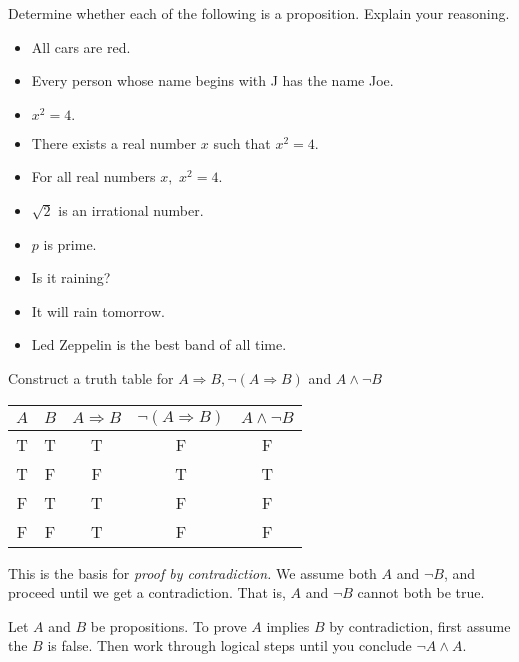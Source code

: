 \documentclass{../ximera}
\begin{document}
\begin{br}
  Determine whether each of the following is a proposition. Explain your reasoning.

  \begin{itemize}
    \item All cars are red.
    \item Every person whose name begins with J has the name Joe.
    \item $x^2=4.$
    \item There exists a real number $x$ such that $x^2=4$.
    \item For all real numbers $x,$ $x^2=4.$
    \item $\sqrt{2}$ is an irrational number.
    \item $p$ is prime.
    \item Is it raining?
    \item It will rain tomorrow.
    \item Led Zeppelin is the best band of all time.
  \end{itemize}
\end{br}



\begin{br}
  Construct a truth table for $A\Rightarrow B, \neg (A\Rightarrow B)$ and $A\land \neg B$

  \begin{solution}
 
    \begin{tabular}{c|c|c|c|c}
      $A$ 	& $B$	& $A\Rightarrow B$ 	& $\neg (A\Rightarrow B)$ & $A\land \neg B$\\\hline
      T 	& T		& T 				& F					& F	\\
      T 	& F 		& F 				& T					& T\\
      F 	& T 		& T 				& F					& F\\
      F 	& F 		& T 				& F					& F\\
    \end{tabular}
  \end{solution}
\end{br}
This is the basis for \emph{proof by contradiction.} We assume both $A$ and $\neg B$, and proceed until we get a contradiction. That is, $A$ and $\neg B$ cannot both be true.

\begin{defn}\label{proof-contradiction}
  Let $A$ and $B$ be propositions. To prove $A$ implies $B$ by contradiction, first assume the $B$ is false. Then work through logical steps until you conclude $\neg A \land A$.
\end{defn}
\end{document}
